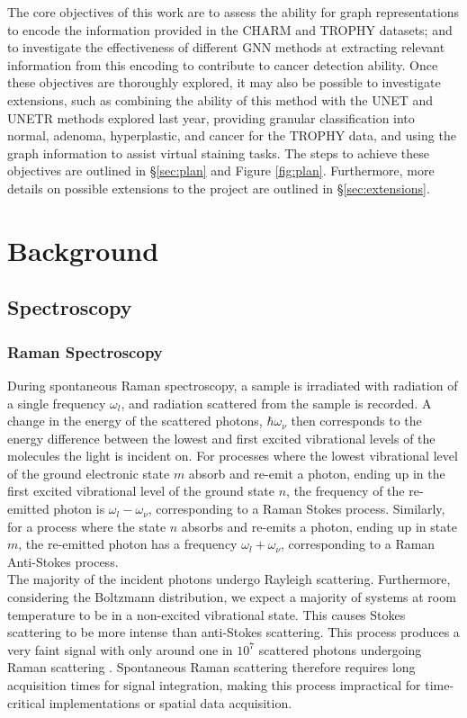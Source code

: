 The core objectives of this work are to assess the ability for graph representations to encode the information provided in the CHARM and TROPHY datasets; and to investigate the effectiveness of different GNN methods at extracting relevant information from this encoding to contribute to cancer detection ability. Once these objectives are thoroughly explored, it may also be possible to investigate extensions, such as combining the ability of this method with the UNET and UNETR methods explored last year, providing granular classification into normal, adenoma, hyperplastic, and cancer for the TROPHY data, and using the graph information to assist virtual staining tasks. The steps to achieve these objectives are outlined in §\ref{sec:plan} and Figure \ref{fig:plan}. Furthermore, more details on possible extensions to the project are outlined in §\ref{sec:extensions}.

\section{Background}
\subsection{Spectroscopy}

\subsubsection{Raman Spectroscopy}

During spontaneous Raman spectroscopy, a sample is irradiated with radiation of a single frequency $\omega_l$, and radiation scattered from the sample is recorded. A change in the energy of the scattered photons, $\hbar \omega_\nu$ then corresponds to the energy difference between the lowest and first excited vibrational levels of the molecules the light is incident on. For processes where the lowest vibrational level of the ground electronic state $m$ absorb and re-emit a photon, ending up in the first excited vibrational level of the ground state $n$, the frequency of the re-emitted photon is $\omega_l-\omega_\nu$, corresponding to a Raman Stokes process. Similarly, for a process where the state $n$ absorbs and re-emits a photon, ending up in state $m$, the re-emitted photon has a frequency $\omega_l+\omega_\nu$, corresponding to a Raman Anti-Stokes process.\\

The majority of the incident photons undergo Rayleigh scattering. Furthermore, considering the Boltzmann distribution, we expect a majority of systems at room temperature to be in a non-excited vibrational state. This causes Stokes scattering to be more intense than anti-Stokes scattering. This process produces a very faint signal with only around one in $10^7$ scattered photons undergoing Raman scattering \cite{smith_modern_2019}. Spontaneous Raman scattering therefore requires long acquisition times for signal integration, making this process impractical for time-critical implementations or spatial data acquisition.\\

